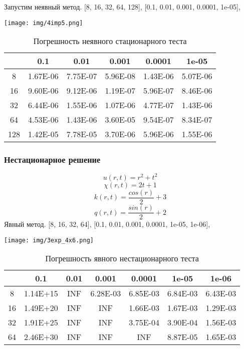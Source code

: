 Запустим неявный метод.
[8, 16, 32, 64, 128],
[0.1, 0.01, 0.001, 0.0001, 1e-05],
\begin{center}
  \texttt{[image: img/4imp5.png]}
\end{center}
\begin{table}[H]
  \centering
  \begin{tabular}{c | c | c | c | c | c}
    \toprule
  & 0.1 & 0.01 & 0.001 & 0.0001 & 1e-05 \\ 
\midrule
8 & 1.67E-06 & 7.75E-07 & 5.96E-08 & 1.43E-06 & 5.07E-06 \\ 
16 & 9.60E-06 & 9.12E-06 & 1.19E-07 & 5.96E-07 & 8.46E-06 \\ 
32 & 6.44E-06 & 1.55E-06 & 1.07E-06 & 4.77E-07 & 1.43E-06 \\ 
64 & 4.53E-06 & 1.43E-06 & 3.60E-05 & 9.54E-07 & 8.34E-07 \\ 
128 & 1.42E-05 & 7.78E-05 & 3.70E-06 & 5.96E-06 & 1.55E-06 \\ 
    \bottomrule
  \end{tabular}
  \caption{Погрешность неявного стационарного теста}
\end{table}


\subsubsection{Нестационарное решение}
\[  u(r, t) = r^2 + t^2 \]
\[  \chi(r, t) = 2t+1 \]
\[  k(r, t) = \frac{cos(r)}{2} + 3 \]
\[  q(r, t) = \frac{sin(r)}{2} + 2 \]
Явный метод.
[8, 16, 32, 64],
[0.1, 0.01, 0.001, 0.0001, 1e-05, 1e-06],
\begin{center}
  \texttt{[image: img/3exp\_4x6.png]}
\end{center}
\begin{table}[H]
  \centering
  \begin{tabular}{c | c | c | c | c | c | c}
    \toprule
  & 0.1 & 0.01 & 0.001 & 0.0001 & 1e-05 & 1e-06 \\ 
\midrule
8 & 1.14E+15 & INF & 6.28E-03 & 6.85E-03 & 6.84E-03 & 6.43E-03 \\ 
16 & 1.49E+20 & INF & INF & 1.66E-03 & 1.67E-03 & 1.29E-03 \\ 
32 & 1.91E+25 & INF & INF & 3.75E-04 & 3.90E-04 & 1.56E-03 \\ 
64 & 2.46E+30 & INF & INF & INF & 8.87E-05 & 1.65E-03 \\ 
    \bottomrule
  \end{tabular}
  \caption{Погрешность явного нестационарного теста}
\end{table}

